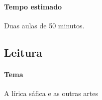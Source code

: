 \documentclass[12pt]{extarticle}
\begin{document}
\paragraph{Tempo estimado} Duas aulas de 50 minutos. 

\subsection{Leitura}









\paragraph{Tema} A lírica sáfica e as outras artes
\end{document}

